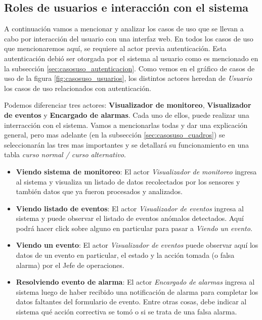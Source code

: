 \subsection{Roles de usuarios e interacción con el sistema}

\par A continuación vamos a mencionar y analizar los casos de uso que se llevan a cabo por interacción del usuario con una interfaz web. En todos los casos de uso que mencionaremos aquí, se requiere al actor previa autenticación. Esta autenticación debió ser otorgada por el sistema al usuario como es mencionado en la subsección \ref{sec:casosuso_autenticacion}. Como vemos en el gráfico de casos de uso de la figura \ref{fig:casosuso_usuarios}, los distintos actores heredan de \textit{Usuario} los casos de uso relacionados con autenticación.

\par Podemos diferenciar tres actores: \textbf{Visualizador de monitoreo}, \textbf{Visualizador de eventos} y \textbf{Encargado de alarmas}. Cada uno de ellos, puede realizar una interracción con el sistema. Vamos a mencionarlas todas y dar una explicación general, pero mas adelante (en la subsección \ref{sec:casosuso_cuadros}) se seleccionarán las tres mas importantes y se detallará su funcionamiento en una tabla \textit{curso normal / curso alternativo}.

\begin{itemize}
  \item \textbf{Viendo sistema de monitoreo}: El actor \textit{Visualizador de monitoreo} ingresa al sistema y visualiza un listado de datos recolectados por los sensores y también datos que ya fueron procesados y analizados.
  \item \textbf{Viendo listado de eventos}: El actor \textit{Visualizador de eventos} ingresa al sistema y puede observar el listado de eventos anómalos detectados. Aquí podrá hacer click sobre alguno en particular para pasar a \textit{Viendo un evento}.
  \item \textbf{Viendo un evento}: El actor \textit{Visualizador de eventos} puede observar aquí los datos de un evento en particular, el estado y la acción tomada (o falsa alarma) por el Jefe de operaciones.
  \item \textbf{Resolviendo evento de alarma}: El actor \textit{Encargado de alarmas} ingresa al sistema luego de haber recibido una notificación de alarma para completar los datos faltantes del formulario de evento. Entre otras cosas, debe indicar al sistema qué acción correctiva se tomó o si se trata de una falsa alarma.
\end{itemize}


